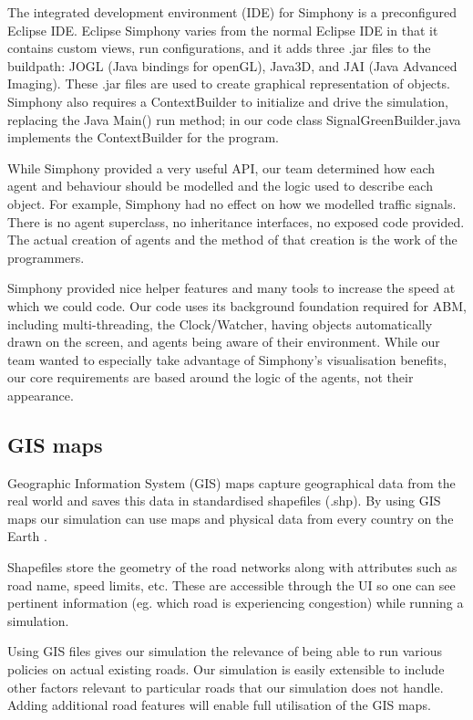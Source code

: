 \documentclass[11pt]{article}
\begin{document}
The integrated development environment (IDE) for Simphony is a preconfigured Eclipse IDE. Eclipse Simphony varies from the normal Eclipse IDE in that it contains custom views, run configurations, and it adds three .jar files to the buildpath: JOGL (Java bindings for openGL), Java3D, and JAI (Java Advanced Imaging). These .jar files are used to create graphical representation of objects. Simphony also requires a ContextBuilder to initialize and drive the simulation, replacing the Java Main() run method; in our code class SignalGreenBuilder.java implements the ContextBuilder for the program.

While Simphony provided a very useful API, our team determined how each agent and behaviour should be modelled and the logic used to describe each object. For example, Simphony had no effect on how we modelled traffic signals. There is no agent superclass, no inheritance interfaces, no exposed code provided. The actual creation of agents and the method of that creation is the work of the programmers. 

Simphony provided nice helper features and many tools to increase the speed at which we could code. Our code uses its background foundation required for ABM, including multi-threading, the Clock/Watcher, having objects automatically drawn on the screen, and agents being aware of their environment. While our team wanted to especially take advantage of Simphony\textquoteright s visualisation benefits, our core requirements are based around the logic of the agents, not their appearance.



\subsection{GIS maps}

Geographic Information System (GIS) maps capture geographical data from the real world and saves this data in standardised shapefiles (.shp). By using GIS maps our simulation can use maps and physical data from every country on the Earth \cite{12m}. 

Shapefiles store the geometry of the road networks along with attributes such as road name, speed limits, etc. These are accessible through the UI so one can see pertinent information (eg. which road is experiencing congestion) while running a simulation. 

Using GIS files gives our simulation the relevance of being able to run various policies on actual existing roads. Our simulation is easily extensible to include other factors relevant to particular roads that our simulation does not handle. Adding additional road features will enable full utilisation of the GIS maps.
\end{document}
